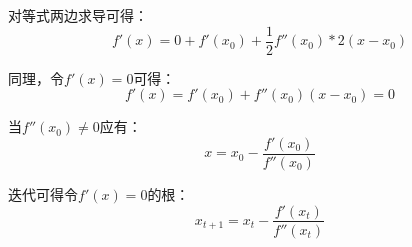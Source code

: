 \documentclass[11pt]{article}
\begin{document}
\begin{appendices}
对等式两边求导可得：
\begin{equation*}
    f'(x) = 0 + f'(x_0) + \frac{1}{2}f''(x_0)*2(x-x_0)
\end{equation*}

同理，令$f'(x) = 0$可得：
\begin{equation*}
    f'(x) = f'(x_0) + f''(x_0)(x-x_0) = 0
\end{equation*}

当$f''(x_0) \neq 0$应有：
\begin{equation*}
    x = x_0 - \frac{f'(x_0)}{f''(x_0)}
\end{equation*}

迭代可得令$f'(x) = 0$的根：
\begin{equation*}
    x_{t+1} = x_t - \frac{f'(x_t)}{f''(x_t)}
\end{equation*}

\end{appendices}
\end{document}
